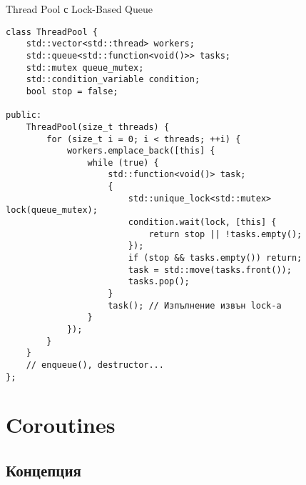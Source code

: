 \documentclass[aspectratio=169]{beamer}
\begin{document}
\begin{frame}[fragile]{Thread Pool с Lock-Based Queue}
\begin{lstlisting}[basicstyle=\ttfamily\tiny]
class ThreadPool {
    std::vector<std::thread> workers;
    std::queue<std::function<void()>> tasks;
    std::mutex queue_mutex;
    std::condition_variable condition;
    bool stop = false;

public:
    ThreadPool(size_t threads) {
        for (size_t i = 0; i < threads; ++i) {
            workers.emplace_back([this] {
                while (true) {
                    std::function<void()> task;
                    {
                        std::unique_lock<std::mutex> lock(queue_mutex);
                        condition.wait(lock, [this] { 
                            return stop || !tasks.empty(); 
                        });
                        if (stop && tasks.empty()) return;
                        task = std::move(tasks.front());
                        tasks.pop();
                    }
                    task(); // Изпълнение извън lock-а
                }
            });
        }
    }
    // enqueue(), destructor...
};
\end{lstlisting}
\end{frame}

\section{Coroutines}

\subsection{Концепция}
\end{document}
